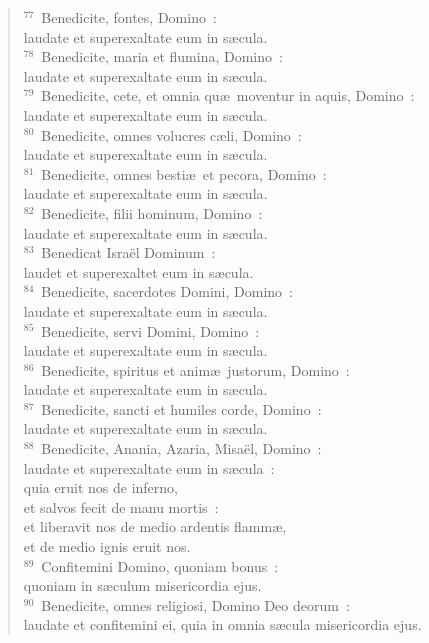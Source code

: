 \begin{verse}
${}^{77}$~Benedicite, fontes, Domino~:\\ laudate et superexaltate eum in s\ae cula.\\
${}^{78}$~Benedicite, maria et flumina, Domino~:\\ laudate et superexaltate eum in s\ae cula.\\
${}^{79}$~Benedicite, cete, et omnia qu\ae\ moventur in aquis, Domino~:\\ laudate et superexaltate eum in s\ae cula.\\
${}^{80}$~Benedicite, omnes volucres c\ae li, Domino~:\\ laudate et superexaltate eum in s\ae cula.\\
${}^{81}$~Benedicite, omnes besti\ae\ et pecora, Domino~:\\ laudate et superexaltate eum in s\ae cula.\\
${}^{82}$~Benedicite, filii hominum, Domino~:\\ laudate et superexaltate eum in s\ae cula.\\
${}^{83}$~Benedicat Isra\"el Dominum~:\\ laudet et superexaltet eum in s\ae cula.\\
${}^{84}$~Benedicite, sacerdotes Domini, Domino~:\\ laudate et superexaltate eum in s\ae cula.\\
${}^{85}$~Benedicite, servi Domini, Domino~:\\ laudate et superexaltate eum in s\ae cula.\\
${}^{86}$~Benedicite, spiritus et anim\ae\ justorum, Domino~:\\ laudate et superexaltate eum in s\ae cula.\\
${}^{87}$~Benedicite, sancti et humiles corde, Domino~:\\ laudate et superexaltate eum in s\ae cula.\\
${}^{88}$~Benedicite, Anania, Azaria, Misa\"el, Domino~:\\ laudate et superexaltate eum in s\ae cula~:\\ quia eruit nos de inferno,\\ et salvos fecit de manu mortis~:\\ et liberavit nos de medio ardentis flamm\ae ,\\ et de medio ignis eruit nos.\\
${}^{89}$~Confitemini Domino, quoniam bonus~:\\ quoniam in s\ae culum misericordia ejus.\\
${}^{90}$~Benedicite, omnes religiosi, Domino Deo deorum~:\\ laudate et confitemini ei, quia in omnia s\ae cula misericordia ejus.\end{verse}


